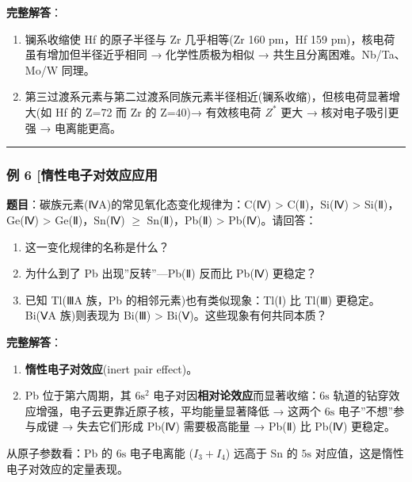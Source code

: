 \textbf{完整解答}：

\begin{enumerate}
\def\labelenumi{(\arabic{enumi})}
\item
  镧系收缩使 Hf 的原子半径与 Zr 几乎相等(Zr 160 pm，Hf 159 pm)，核电荷虽有增加但半径近乎相同 → 化学性质极为相似 → 共生且分离困难。Nb/Ta、Mo/W 同理。
\item
  第三过渡系元素与第二过渡系同族元素半径相近(镧系收缩)，但核电荷显著增大(如 Hf 的 Z=72 而 Zr 的 Z=40)→ 有效核电荷 \(Z^*\) 更大 → 核对电子吸引更强 → 电离能更高。
\end{enumerate}

\begin{center}\rule{0.5\linewidth}{0.5pt}\end{center}

\subsubsection{例 6 {[}惰性电子对效应应用}\label{ux4f8b-6-ux60f0ux6027ux7535ux5b50ux5bf9ux6548ux5e94ux5e94ux7528}

\textbf{题目}：碳族元素(ⅣA)的常见氧化态变化规律为：C(Ⅳ) \textgreater{} C(Ⅱ)，Si(Ⅳ) \textgreater{} Si(Ⅱ)，Ge(Ⅳ) \textgreater{} Ge(Ⅱ)，Sn(Ⅳ) \(\geq\) Sn(Ⅱ)，Pb(Ⅱ) \textgreater{} Pb(Ⅳ)。请回答：

\begin{enumerate}
\def\labelenumi{(\arabic{enumi})}
\tightlist
\item
  这一变化规律的名称是什么？
\item
  为什么到了 Pb 出现''反转''---Pb(Ⅱ) 反而比 Pb(Ⅳ) 更稳定？
\item
  已知 Tl(ⅢA 族，Pb 的相邻元素)也有类似现象：Tl(Ⅰ) 比 Tl(Ⅲ) 更稳定。Bi(ⅤA 族)则表现为 Bi(Ⅲ) \textgreater{} Bi(Ⅴ)。这些现象有何共同本质？
\end{enumerate}

\textbf{完整解答}：

\begin{enumerate}
\def\labelenumi{(\arabic{enumi})}
\item
  \textbf{惰性电子对效应}(inert pair effect)。
\item
  Pb 位于第六周期，其 \(6\mathrm{s}^2\) 电子对因\textbf{相对论效应}而显著收缩：\(6\mathrm{s}\) 轨道的钻穿效应增强，电子云更靠近原子核，平均能量显著降低 → 这两个 \(6\mathrm{s}\) 电子''不想''参与成键 → 失去它们形成 Pb(Ⅳ) 需要极高能量 → Pb(Ⅱ) 比 Pb(Ⅳ) 更稳定。
\end{enumerate}

从原子参数看：Pb 的 \(6\mathrm{s}\) 电子电离能 (\(I_3 + I_4\)) 远高于 Sn 的 \(5\mathrm{s}\) 对应值，这是惰性电子对效应的定量表现。

